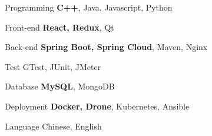 
\begin{cvskills}

  \cvskill
    {Programming} %
    {{\bfseries C++}, Java, Javascript, Python} %

  \cvskill
    {Front-end} %
    {{\bfseries React, Redux}, Qt} %

  \cvskill
    {Back-end} %
    {{\bfseries Spring Boot, Spring Cloud}, Maven, Nginx} %
    
  \cvskill
    {Test} %
    {GTest, JUnit, JMeter} %

  \cvskill
    {Database} %
    {{\bfseries MySQL}, MongoDB} %

  \cvskill
    {Deployment} %
    {{\bfseries Docker, Drone}, Kubernetes, Ansible} %

  \cvskill
    {Language} %
    {Chinese, English} %

\end{cvskills}
